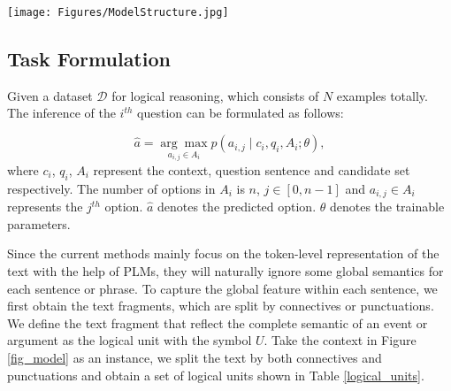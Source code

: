 \documentclass[sigconf]{acmart}
\begin{document}
\begin{figure*}[t]
	\large
	\centering
	\texttt{[image: Figures/ModelStructure.jpg]}
	\caption{The architecture of Logiformer. The left part is an input example of the dataset. The graph construction modules (\textit{a1,a2}) split the text into logical units and build two graphs from two branches respectively. The graph transformer structures (\textit{b1,b2}) update the text features combined with the logical and syntactic relations. Finally, the decoder module (\textit{c}) is utilized to conduct the feature fusion and predict the answers.}
	\label{fig_model}
	\vspace{-0.1cm}
\end{figure*}

\subsection{Task Formulation}
Given a dataset $\mathcal{D}$ for logical reasoning, which consists of $N$ examples totally. The inference of the $i^{th}$ question can be formulated as follows:

\vspace{-0.5cm}
\begin{equation}
	\hat{a} =\underset{a_{i,j} \in A_{i}}{\arg \max }  p\left(a_{i, j} \mid c_{i}, q_{i}, A_{i}; \theta\right),
\end{equation}
where $c_{i}$, $q_{i}$, $A_{i}$ represent the context, question sentence and candidate set respectively. The number of options in $A_{i}$ is $n$, $j \in [0,n-1]$ and $a_{i,j}\in A_{i}$ represents the $j^{th}$ option. $\hat{a}$ denotes the predicted option. $\theta$ denotes the trainable parameters.

Since the current methods mainly focus on the token-level representation of the text with the help of PLMs, they will naturally ignore some global semantics for each sentence or phrase. To capture the global feature within each sentence, we first obtain the text fragments, which are split by connectives or punctuations. We define the text fragment that reflect the complete semantic of an event or argument as the logical unit with the symbol $U$. Take the context in Figure \ref{fig_model} as an instance, we split the text by both connectives and punctuations and obtain a set of logical units shown in Table \ref{logical_units}.
\end{document}
